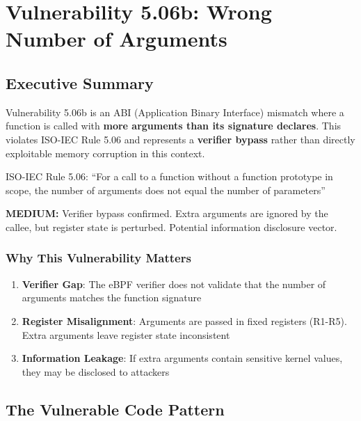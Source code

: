 \chapter{Vulnerability 5.06b: Wrong Number of Arguments}

\section{Executive Summary}

Vulnerability 5.06b is an ABI (Application Binary Interface) mismatch where a function is called with \textbf{more arguments than its signature declares}. This violates ISO-IEC Rule 5.06 and represents a \textbf{verifier bypass} rather than directly exploitable memory corruption in this context.

\begin{tcolorbox}[colback=blue!5!white,colframe=blue!75!black,title=ISO Rule Violated,fonttitle=\bfseries]
ISO-IEC Rule 5.06: ``For a call to a function without a function prototype in scope, the number of arguments does not equal the number of parameters''
\end{tcolorbox}

\begin{tcolorbox}[colback=yellow!5!white,colframe=orange!75!black,title=Severity,fonttitle=\bfseries]
\textbf{MEDIUM:} Verifier bypass confirmed. Extra arguments are ignored by the callee, but register state is perturbed. Potential information disclosure vector.
\end{tcolorbox}

\subsection{Why This Vulnerability Matters}

\begin{enumerate}[label=\arabic*.]
  \item \textbf{Verifier Gap}: The eBPF verifier does not validate that the number of arguments matches the function signature
  \item \textbf{Register Misalignment}: Arguments are passed in fixed registers (R1-R5). Extra arguments leave register state inconsistent
  \item \textbf{Information Leakage}: If extra arguments contain sensitive kernel values, they may be disclosed to attackers
\end{enumerate}

\section{The Vulnerable Code Pattern}

